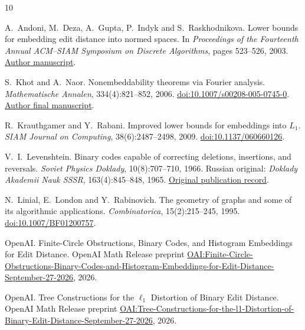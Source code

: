 \begin{thebibliography}{10}

A.~Andoni, M.~Deza, A.~Gupta, P.~Indyk and S.~Raskhodnikova.
\newblock Lower bounds for embedding edit distance into normed spaces.
\newblock In \emph{Proceedings of the Fourteenth Annual ACM--SIAM
Symposium on Discrete Algorithms}, pages 523--526, 2003.
\newblock \href{https://www.cs.columbia.edu/~andoni/papers/k2n2.pdf}{Author manuscript}.

S.~Khot and A.~Naor.
\newblock Nonembeddability theorems via Fourier analysis.
\newblock \emph{Mathematische Annalen}, 334(4):821--852, 2006.
\newblock \href{https://doi.org/10.1007/s00208-005-0745-0}{doi:10.1007/s00208-005-0745-0}.
\newblock \href{https://web.math.princeton.edu/~naor/homepage\%20files/nonembed-final.pdf}{Author final manuscript}.

R.~Krauthgamer and Y.~Rabani.
\newblock Improved lower bounds for embeddings into $L_1$.
\newblock \emph{SIAM Journal on Computing}, 38(6):2487--2498, 2009.
\newblock \href{https://doi.org/10.1137/060660126}{doi:10.1137/060660126}.

V.~I.~Levenshtein.
\newblock Binary codes capable of correcting deletions, insertions, and reversals.
\newblock \emph{Soviet Physics Doklady}, 10(8):707--710, 1966.
\newblock Russian original: \emph{Doklady Akademii Nauk SSSR},
163(4):845--848, 1965.
\newblock \href{https://www.mathnet.ru/eng/dan31411}{Original publication record}.

N.~Linial, E.~London and Y.~Rabinovich.
\newblock The geometry of graphs and some of its algorithmic applications.
\newblock \emph{Combinatorica}, 15(2):215--245, 1995.
\newblock \href{https://doi.org/10.1007/BF01200757}{doi:10.1007/BF01200757}.

OpenAI.
\newblock Finite-Circle Obstructions, Binary Codes, and Histogram Embeddings for Edit Distance.
\newblock OpenAI Math Release preprint
\href{https://github.com/openai/math/blob/main/preprints/Finite-Circle-Obstructions-Binary-Codes-and-Histogram-Embeddings-for-Edit-Distance-September-27-2026/paper.pdf}{OAI:Finite-Circle-Obstructions-Binary-Codes-and-Histogram-Embeddings-for-Edit-Distance-September-27-2026}, 2026.

OpenAI.
\newblock Tree Constructions for the $\ell_1$ Distortion of Binary Edit Distance.
\newblock OpenAI Math Release preprint
\href{https://github.com/openai/math/blob/main/preprints/Tree-Constructions-for-the-l1-Distortion-of-Binary-Edit-Distance-September-27-2026/paper.pdf}{OAI:Tree-Constructions-for-the-l1-Distortion-of-Binary-Edit-Distance-September-27-2026}, 2026.


\end{thebibliography}
